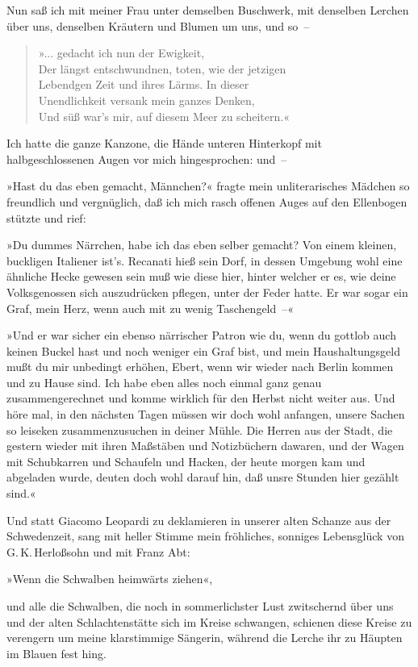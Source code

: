 Nun saß ich mit meiner Frau unter demselben Buschwerk, mit
denselben Lerchen über uns, denselben Kräutern und Blumen um uns,
und so~–

\begin{verse}
»... gedacht ich nun der Ewigkeit,\\
Der längst entschwundnen, toten, wie der jetzigen\\
Lebendgen Zeit und ihres Lärms. In dieser\\
Unendlichkeit versank mein ganzes Denken,\\
Und süß war's mir, auf diesem Meer zu scheitern.«
\end{verse}

Ich hatte die ganze Kanzone, die Hände unteren Hinterkopf mit
halbgeschlossenen Augen vor mich hingesprochen: und~–

»Hast du das eben gemacht, Männchen?« fragte mein unliterarisches
Mädchen so freundlich und vergnüglich, daß ich mich rasch offenen
Auges auf den Ellenbogen stützte und rief:

»Du dummes Närrchen, habe ich das eben selber gemacht? Von einem
kleinen, buckligen Italiener ist's. Recanati hieß sein Dorf, in
dessen Umgebung wohl eine ähnliche Hecke gewesen sein muß wie diese
hier, hinter welcher er es, wie deine Volksgenossen sich
auszudrücken pflegen, unter der Feder hatte. Er war sogar ein Graf,
mein Herz, wenn auch mit zu wenig Taschengeld~–«

»Und er war sicher ein ebenso närrischer Patron wie du, wenn du
gottlob auch keinen Buckel hast und noch weniger ein Graf bist, und
mein Haushaltungsgeld mußt du mir unbedingt erhöhen, Ebert, wenn
wir wieder nach Berlin kommen und zu Hause sind. Ich habe eben
alles noch einmal ganz genau zusammengerechnet und komme wirklich
für den Herbst nicht weiter aus. Und höre mal, in den nächsten
Tagen müssen wir doch wohl anfangen, unsere Sachen so leiseken
zusammenzusuchen in deiner Mühle. Die Herren aus der Stadt, die
gestern wieder mit ihren Maßstäben und Notizbüchern dawaren, und
der Wagen mit Schubkarren und Schaufeln und Hacken, der heute
morgen kam und abgeladen wurde, deuten doch wohl darauf hin, daß
unsre Stunden hier gezählt sind.«

Und statt Giacomo Leopardi zu deklamieren in unserer alten Schanze
aus der Schwedenzeit, sang mit heller Stimme mein fröhliches,
sonniges Lebensglück von G.\,K.\,Herloßsohn und mit Franz Abt:

\begin{center}
»Wenn die Schwalben heimwärts ziehen«,
\end{center}
\noindent
und alle die
Schwalben, die noch in sommerlichster Lust zwitschernd über uns und
der alten Schlachtenstätte sich im Kreise schwangen, schienen diese
Kreise zu verengern um meine klarstimmige Sängerin, während die
Lerche ihr zu Häupten im Blauen fest hing.

